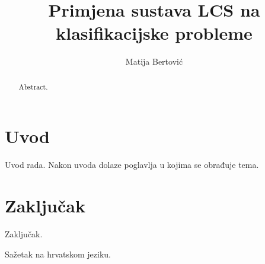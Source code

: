 \documentclass[times, utf8, zavrsni]{fer}
\begin{document}

\title{Primjena sustava LCS na klasifikacijske probleme}

\author{Matija Bertović}

\maketitle

\izvornik

\zahvala{}

\tableofcontents

\chapter{Uvod}
Uvod rada. Nakon uvoda dolaze poglavlja u kojima se obrađuje tema.

\chapter{Zaključak}
Zaključak.




\begin{sazetak}
Sažetak na hrvatskom jeziku.

\end{sazetak}

\begin{abstract}
Abstract.

\end{abstract}
\end{document}
